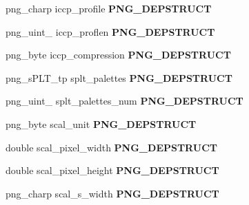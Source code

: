 \begin{DoxyCompactItemize}
\item 
png\+\_\+charp iccp\+\_\+profile {\bfseries P\+N\+G\+\_\+\+D\+E\+P\+S\+T\+R\+U\+CT}\hypertarget{structpng__info__struct_a0d85668e02491ed5a9b689a9cba90a84}{}\label{structpng__info__struct_a0d85668e02491ed5a9b689a9cba90a84}

\item 
png\+\_\+uint\+\_ iccp\+\_\+proflen {\bfseries P\+N\+G\+\_\+\+D\+E\+P\+S\+T\+R\+U\+CT}\hypertarget{structpng__info__struct_a1bb2443414c3316280ffe4494e43ff48}{}\label{structpng__info__struct_a1bb2443414c3316280ffe4494e43ff48}

\item 
png\+\_\+byte iccp\+\_\+compression {\bfseries P\+N\+G\+\_\+\+D\+E\+P\+S\+T\+R\+U\+CT}\hypertarget{structpng__info__struct_af67846c07fb819e9690e3da29184dfe7}{}\label{structpng__info__struct_af67846c07fb819e9690e3da29184dfe7}

\item 
png\+\_\+s\+P\+L\+T\+\_\+tp splt\+\_\+palettes {\bfseries P\+N\+G\+\_\+\+D\+E\+P\+S\+T\+R\+U\+CT}\hypertarget{structpng__info__struct_a575503e2782cf15791d84be8a850735e}{}\label{structpng__info__struct_a575503e2782cf15791d84be8a850735e}

\item 
png\+\_\+uint\+\_ splt\+\_\+palettes\+\_\+num {\bfseries P\+N\+G\+\_\+\+D\+E\+P\+S\+T\+R\+U\+CT}\hypertarget{structpng__info__struct_adad20551d7f3ec033396736469bbcac8}{}\label{structpng__info__struct_adad20551d7f3ec033396736469bbcac8}

\item 
png\+\_\+byte scal\+\_\+unit {\bfseries P\+N\+G\+\_\+\+D\+E\+P\+S\+T\+R\+U\+CT}\hypertarget{structpng__info__struct_a3cf6c5d71a36c0f441fd61f794b5010d}{}\label{structpng__info__struct_a3cf6c5d71a36c0f441fd61f794b5010d}

\item 
double scal\+\_\+pixel\+\_\+width {\bfseries P\+N\+G\+\_\+\+D\+E\+P\+S\+T\+R\+U\+CT}\hypertarget{structpng__info__struct_a08a7b61762a1ebab69b1ff9249d5b4fe}{}\label{structpng__info__struct_a08a7b61762a1ebab69b1ff9249d5b4fe}

\item 
double scal\+\_\+pixel\+\_\+height {\bfseries P\+N\+G\+\_\+\+D\+E\+P\+S\+T\+R\+U\+CT}\hypertarget{structpng__info__struct_ae0401850bffdccfb52f4bee889527a63}{}\label{structpng__info__struct_ae0401850bffdccfb52f4bee889527a63}

\item 
png\+\_\+charp scal\+\_\+s\+\_\+width {\bfseries P\+N\+G\+\_\+\+D\+E\+P\+S\+T\+R\+U\+CT}\hypertarget{structpng__info__struct_abc0879eec3711aa6c9f82f144060622c}{}\label{structpng__info__struct_abc0879eec3711aa6c9f82f144060622c}


\end{DoxyCompactItemize}
